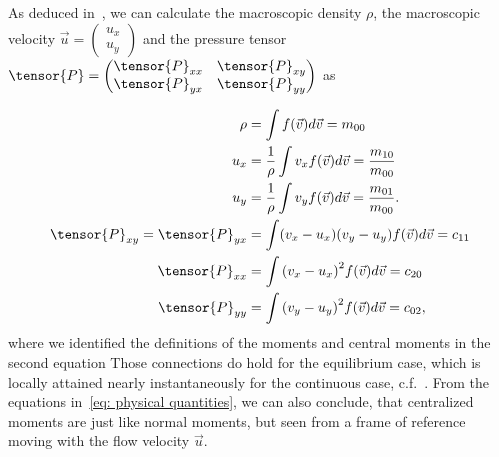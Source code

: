 As deduced in~\cite[pages 23 ff.]{harris2004introduction}, we can calculate the macroscopic density $\rho$, the macroscopic velocity $\vec{u}=\begin{pmatrix}u_x\\u_y\end{pmatrix}$ and the pressure tensor $\tensor{P}=\begin{pmatrix}\tensor{P}_{xx}&\tensor{P}_{xy}\\ \tensor{P}_{yx}&\tensor{P}_{yy}\end{pmatrix}$ as

\begin{equation}
  \label{eq: physical quantities}
  \begin{aligned}
    \rho & = \int f(\vec{v}) d\vec{v} = m_{00} \\
    u_x
    & = \frac{1}{\rho}\int v_x f(\vec{v}) d\vec{v} = \frac{ m_{10} }{ m_{00} }\\
    u_y
    & = \frac{1}{\rho}\int v_y f(\vec{v}) d\vec{v} = \frac{ m_{01} }{ m_{00} }.\\
    \tensor{P}_{xy}=\tensor{P}_{yx}
    & = \int (v_x - u_x)(v_y - u_y) f(\vec{v}) d\vec{v}
      = c_{11} \\
    \tensor{P}_{xx}
    & = \int {(v_x - u_x)}^2 f(\vec{v}) d\vec{v}
      = c_{20} \\
    \tensor{P}_{yy}
    & = \int {(v_y - u_y)}^2 f(\vec{v}) d\vec{v}
      = c_{02},
  \end{aligned}
\end{equation}
where we identified the definitions of the moments and central moments in the second equation
Those connections do hold for the equilibrium case, which is locally attained nearly instantaneously for the continuous case, c.f.~\cite[page 218]{smits2000physical}.
From the equations in~\eqref{eq: physical quantities}, we can also conclude, that centralized moments are just like normal moments, but seen from a frame of reference moving with the flow velocity $\vec{u}$.

